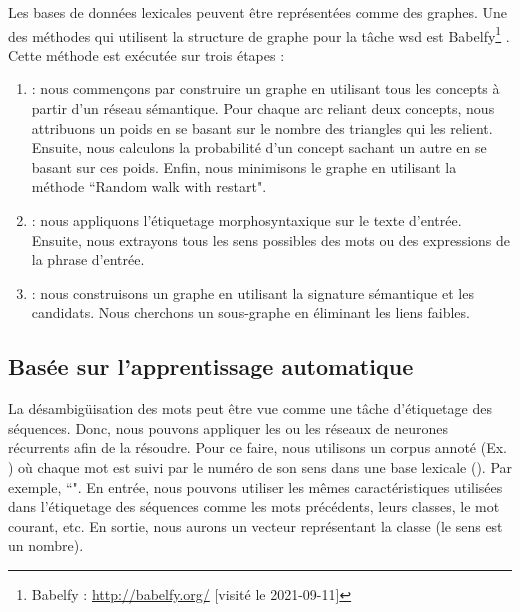 \documentclass{KodeBook}
\begin{document}
Les bases de données lexicales peuvent être représentées comme des graphes. 
Une des méthodes qui utilisent la structure de graphe pour la tâche \ac{wsd} est Babelfy\footnote{Babelfy : \url{http://babelfy.org/} [visité le 2021-09-11]} \cite{2014-moro-al}. 
Cette méthode est exécutée sur trois étapes :
\begin{enumerate}  
	\item {} : nous commençons par construire un graphe en utilisant tous les concepts à partir d'un réseau sémantique.
	Pour chaque arc reliant deux concepts, nous attribuons un poids en se basant sur le nombre des triangles qui les relient.
	Ensuite, nous calculons la probabilité d'un concept sachant un autre en se basant sur ces poids. 
	Enfin, nous minimisons le graphe en utilisant la méthode ``Random walk with restart".
	
	\item {} : nous appliquons l'étiquetage morphosyntaxique sur le texte d'entrée.
	Ensuite, nous extrayons tous les sens possibles des mots ou des expressions de la phrase d'entrée.

	\item {} : nous construisons un graphe en utilisant la signature sémantique et les candidats.
	Nous cherchons un sous-graphe en éliminant les liens faibles.
\end{enumerate}

\subsection{Basée sur l'apprentissage automatique}

La désambigüisation des mots peut être vue comme une tâche d'étiquetage des séquences. 
Donc, nous pouvons appliquer les  ou les réseaux de neurones récurrents afin de la résoudre. 
Pour ce faire, nous utilisons un corpus annoté (Ex. ) où chaque mot est suivi par le numéro de son sens dans une base lexicale ().
Par exemple, ``".
En entrée, nous pouvons utiliser les mêmes caractéristiques utilisées dans l'étiquetage des séquences comme les mots précédents, leurs classes, le mot courant, etc. 
En sortie, nous aurons un vecteur  représentant la classe (le sens est un nombre). 
\end{document}
